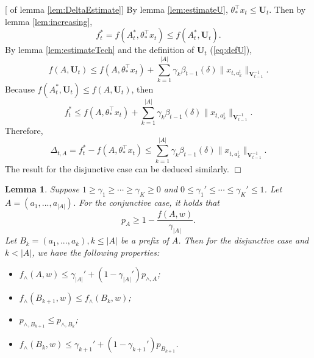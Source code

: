 \documentclass{article}
\newcommand{\bU}{\mathbf{U}}
\newcommand{\bV}{\mathbf{V}}
\newcommand{\abs}[1]{\left| #1 \right|}
\newcommand{\norm}[1]{\| #1 \|}
\newtheorem{lemma}[theorem]{Lemma}%
\newenvironment{proof}{\noindent {\textbf{Proof. }}}{$\Box$ \medskip}
\begin{document}
\begin{proof}[ of lemma \ref{lem:DeltaEstimate}]
By lemma \ref{lem:estimateU}, $\theta_{\ast}^{\top}x_t \leq \bU_t$. Then by lemma \ref{lem:increasing},
$$
f_t^{\ast} = f(A_t^{\ast}, \theta_{\ast}^{\top}x_t) \leq f(A_t^{\ast}, \bU_t).
$$
By lemma \ref{lem:estimateTech} and the definition of $\bU_t$ (\ref{eq:defU}),
$$
f(A, \bU_t) \leq f(A, \theta_{\ast}^{\top}x_t) + \sum_{k=1}^{\abs{A}} \gamma_k \beta_{t-1}(\delta)\norm{x_{t, a_k^t}}_{\bV_{t-1}^{-1}}.
$$
Because $f(A_t^{\ast}, \bU_t) \leq f(A, \bU_t)$, then 
$$
f_t^{\ast} \leq f(A, \theta_{\ast}^{\top}x_t) + \sum_{k=1}^{\abs{A}} \gamma_k \beta_{t-1}(\delta)\norm{x_{t, a_k^t}}_{\bV_{t-1}^{-1}}.
$$
Therefore,
$$
\Delta_{t, A} = f_t^{\ast} - f(A, \theta_{\ast}^{\top}x_t) \leq \sum_{k=1}^{\abs{A}} \gamma_k \beta_{t-1}(\delta)\norm{x_{t, a_k^t}}_{\bV_{t-1}^{-1}}.
$$
The result for the disjunctive case can be deduced similarly.
\end{proof}

\begin{lemma}
\label{lem:prefixRelation}
Suppose $1 \geq \gamma_1 \geq \cdots \geq \gamma_K \geq 0$ and $0 \leq \gamma_1' \leq \cdots \leq \gamma_K' \leq 1$. Let $A = (a_1, ..., a_{\abs{A}})$. For the conjunctive case, it holds that
$$
p_A \geq 1 - \frac{f(A, w)}{\gamma_{\abs{A}}}.
$$
Let $B_k = (a_1, ..., a_k), k \leq \abs{A}$ be a prefix of $A$. Then for the disjunctive case and $k < \abs{A}$, we have the following properties:
\begin{itemize}
\item[(1)] $f_{\wedge}(A, w) \leq \gamma_{\abs{A}}' + (1 - \gamma_{\abs{A}}') p_{\wedge, A}$;
\item[(2)] $f_{\wedge}(B_{k+1}, w) \leq f_{\wedge}(B_k, w)$;
\item[(3)] $p_{\wedge, B_{k+1}} \leq p_{\wedge, B_k}$;
\item[(4)] $f_{\wedge}(B_k, w) \leq \gamma_{k+1}' + (1 - \gamma_{k+1}') p_{B_{k+1}}$.
\end{itemize}
\end{lemma}
\end{document}
